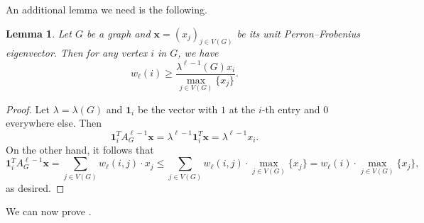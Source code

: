 \documentclass[11pt,a4paper]{article}
\newtheorem{lemma}[theorem]{Lemma}
\theoremstyle{definition}
\theoremstyle{remark}
\begin{document}
An additional lemma we need is the following. 

\begin{lemma}
    \label{lem:walks-lower}
    Let $G$ be a graph and $\bm{x}=(x_j)_{j\in V(G)}$ be its unit Perron--Frobenius eigenvector. Then for any vertex $i$ in $G$, we have
    $$w_\ell(i) \geq \frac{\lambda^{\ell - 1}(G) x_i}{\max_{j \in V(G)} \{x_j\}}.$$
\end{lemma}
\begin{proof}
    Let $\lambda=\lambda(G)$ and $\mathbf{1}_i$ be the vector with $1$ at the $i$-th entry and $0$ everywhere else. Then
    $$\mathbf{1}_i^T A_G^{\ell - 1} \bm{x} = \lambda^{\ell - 1}  \mathbf{1}_i^T \bm{x}  = \lambda^{\ell - 1} x_i.$$
    On the other hand, it follows that 
    $$ \mathbf{1}_i^T A_G^{\ell - 1} \bm{x}   
   = \sum_{j \in V(G)}w_\ell(i, j) \cdot x_j \leq 
     \sum_{j \in V(G)}w_\ell(i, j) \cdot \max_{j \in V(G)} \{ x_j \} = w_\ell(i) \cdot \max_{j \in V(G)} \{ x_j \},$$
    as desired.
\end{proof}

We can now prove .
\end{document}
